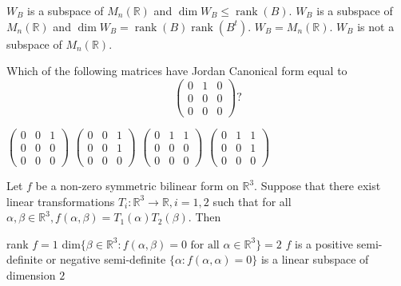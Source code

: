 \documentclass[10pt]{exam}
\DeclareMathOperator{\rank}{\text{rank}}
\newcommand{\R}{\ensuremath{\mathbb{R}}}
\begin{document}
\begin{questions}
\begin{checkboxes}
\choice $W_B$ is a subspace of $M_n(\R)$ and $\dim W_B \leq \rank(B)$.
\choice $W_B$ is a subspace of $M_n(\R)$ and $\dim W_B = \rank(B)\rank(B^t)$.
\choice $W_B=M_n(\R)$.
\choice $W_B$ is not a subspace of $M_n(\R)$.
\end{checkboxes}

\question
Which of the following matrices have Jordan Canonical form equal to 
$$\begin{pmatrix} 0 & 1 & 0 \\ 0 & 0 & 0 \\ 0 & 0 & 0 \end{pmatrix}?$$

\begin{oneparcheckboxes}
\choice $\begin{pmatrix} 0 & 0 & 1 \\ 0 & 0 & 0 \\ 0 & 0 & 0 \end{pmatrix}$
\choice $\begin{pmatrix} 0 & 0 & 1 \\ 0 & 0 & 1 \\ 0 & 0 & 0 \end{pmatrix}$
\choice $\begin{pmatrix} 0 & 1 & 1 \\ 0 & 0 & 0 \\ 0 & 0 & 0 \end{pmatrix}$
\choice $\begin{pmatrix} 0 & 1 & 1 \\ 0 & 0 & 1 \\ 0 & 0 & 0 \end{pmatrix}$
\end{oneparcheckboxes} 

\question
Let $f$ be a non-zero symmetric bilinear form on $\mathbb{R}^3$. Suppose that there exist linear transformations $T_i: \mathbb{R}^3 \rightarrow \mathbb{R} , i = 1,2 $ such that for all $ \alpha , \beta \in \mathbb{R}^3, f(\alpha, \beta) = T_1(\alpha) T_2(\beta)$. Then 

\begin{checkboxes}
\choice rank $f = 1$
\choice dim$\{\beta \in \mathbb{R}^3 : f(\alpha, \beta) = 0 \text{ for all } \alpha \in \mathbb{R}^3 \} = 2$
\choice $f$ is a positive semi-definite or negative semi-definite
\choice $\{\alpha : f(\alpha, \alpha ) = 0 \} $ is a linear subspace of dimension $2$
\end{checkboxes} 



\end{questions}
\end{document}

